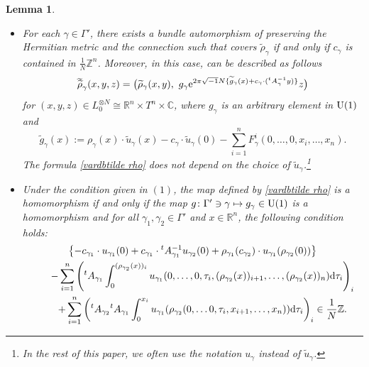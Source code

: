 \documentclass[pdftex]{sigma}
\numberwithin{equation}{section}
\newtheorem{Lemma}[Theorem]{Lemma}
\newcommand{\C}{\mathbb{C}}
\newcommand{\R}{\mathbb{R}}
\newcommand{\Z}{\mathbb{Z}}
\renewcommand{\tilde}{\widetilde}
\newcommand{\vardbtilde}[1]{\tilde{\raisebox{0pt}[0.85\height]{$\tilde{#1}$}}}
\def\Aut{\operatorname{Aut}}
\begin{document}
\begin{Lemma}\label{condition for lift of Gamma-action to tilde_L}\quad
\begin{itemize}\itemsep=0pt
\item[$(1)$] For each $\gamma\in \Gamma'$, there exists a bundle automorphism \smash{$\vardbtilde \rho_\gamma$} of  preserving the Hermitian metric and the connection such that \smash{$\vardbtilde \rho_\gamma$} covers $\tilde \rho_\gamma$
if and only if $c_\gamma$ is contained in $\frac{1}{N}\Z^n$. Moreover, in this case, \smash{$\vardbtilde \rho_\gamma$} can be described as follows
\begin{equation}\label{vardbtilde rho}
{\vardbtilde \rho}_\gamma (x,y,z)=\bigl( {\tilde \rho}_\gamma (x,y),\ g_\gamma {\rm e}^{2\pi\sqrt{-1}N\{{\tilde g}_\gamma(x)+c_\gamma\cdot ({}^tA_\gamma^{-1}y)\}}z\bigr)
\end{equation}
 for $(x,y,z)\in L_0^{\otimes N}\cong \R^n\times T^n\times \C$, where $g_\gamma$ is an arbitrary element in ${\rm U}(1)$ and
\[%
{\tilde g}_\gamma(x):=\rho_\gamma (x)\cdot {\tilde u}_\gamma(x)-c_\gamma\cdot {\tilde u}_\gamma (0)-\sum_{i=1}^nF_\gamma^i(0,\ldots ,0,x_i,\ldots ,x_n).
\]
The formula \eqref{vardbtilde rho} does not depend on the choice of ${\tilde u}_\gamma$.\footnote{In the rest of this paper, we often use the notation $u_\gamma$ instead of ${\tilde u}_\gamma$.}
\item[$(2)$] Under the condition given in $(1)$, the map \smash{$\vardbtilde \rho\colon \Gamma' \to \Aut \bigl(\bigl( L_0, \nabla^{L_0}\bigr)^{\otimes N}\bigr)$} defined by \eqref{vardbtilde rho} is a homomorphism if and only if
the map $g\colon \Gamma'\ni \gamma\mapsto g_\gamma \in {\rm U}(1)$ is a homomorphism and for all $\gamma_1, \gamma_2 \in \Gamma'$ and $x\in \R^n$, the following condition holds:
\begin{gather*}
\bigl\{-c_{\gamma_1}\cdot u_{\gamma_1}(0)+c_{\gamma_1}\cdot {}^tA_{\gamma_1}^{-1}u_{\gamma_2}(0)+\rho_{\gamma_1}(c_{\gamma_2})\cdot u_{\gamma_1}(\rho_{\gamma_2}(0))\bigr\}\\
\qquad-\sum_{i=1}^n\left({}^tA_{\gamma_1}\int_0^{(\rho_{\gamma_2}(x))_i}u_{\gamma_1}(0,\ldots ,0,\tau_i,(\rho_{\gamma_2}(x))_{i+1},\ldots ,(\rho_{\gamma_2}(x))_n){\rm d}\tau_i\right)_i \\
\qquad+\sum_{i=1}^n\left({}^tA_{\gamma_2}{}^tA_{\gamma_1}\int_0^{x_i}u_{\gamma_1}(\rho_{\gamma_2}(0,\ldots 0,\tau_i,x_{i+1},\ldots ,x_n)){\rm d}\tau_i\right)_i \in\frac{1}{N}\Z .
\end{gather*}
\end{itemize}
\end{Lemma}
\end{document}
